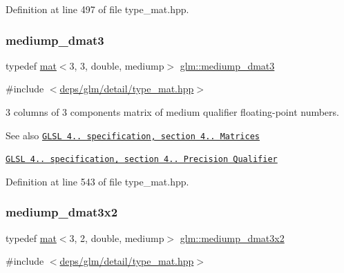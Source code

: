 Definition at line 497 of file type\+\_\+mat.\+hpp.

\mbox{\label{group__core__precision_gaf1be0a781d33d2450a31e64e09d8d18f}} 
\subsubsection{\texorpdfstring{mediump\+\_\+dmat3}{mediump\_dmat3}}
{\footnotesize\ttfamily typedef \hyperlink{structglm_1_1mat}{mat}$<$3, 3, double, mediump$>$ \hyperlink{group__core__precision_gaf1be0a781d33d2450a31e64e09d8d18f}{glm\+::mediump\+\_\+dmat3}}



{\ttfamily \#include $<$\hyperlink{type__mat_8hpp}{deps/glm/detail/type\+\_\+mat.\+hpp}$>$}

3 columns of 3 components matrix of medium qualifier floating-\/point numbers.

\begin{DoxySeeAlso}{See also}
\href{http://www.opengl.org/registry/doc/GLSLangSpec.4.20.8.pdf}{\tt G\+L\+SL 4.. specification, section 4.. Matrices} 

\href{http://www.opengl.org/registry/doc/GLSLangSpec.4.20.8.pdf}{\tt G\+L\+SL 4.. specification, section 4.. Precision Qualifier} 
\end{DoxySeeAlso}


Definition at line 543 of file type\+\_\+mat.\+hpp.

\mbox{\label{group__core__precision_gaefc11f3917dc7882f4399a47393792fa}} 
\subsubsection{\texorpdfstring{mediump\+\_\+dmat3x2}{mediump\_dmat3x2}}
{\footnotesize\ttfamily typedef \hyperlink{structglm_1_1mat}{mat}$<$3, 2, double, mediump$>$ \hyperlink{group__core__precision_gaefc11f3917dc7882f4399a47393792fa}{glm\+::mediump\+\_\+dmat3x2}}



{\ttfamily \#include $<$\hyperlink{type__mat_8hpp}{deps/glm/detail/type\+\_\+mat.\+hpp}$>$}

